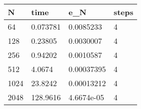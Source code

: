 \begin{tabular}{llll}
N & time & e_N & steps \\ 
\hline 
64 & 0.073781 & 0.0085233 & 4 \\ 
128 & 0.23805 & 0.0030007 & 4 \\ 
256 & 0.94202 & 0.0010587 & 4 \\ 
512 & 4.0674 & 0.00037395 & 4 \\ 
1024 & 23.8242 & 0.00013212 & 4 \\ 
2048 & 128.9616 & 4.6674e-05 & 4 \\ 
\hline 
\end{tabular}